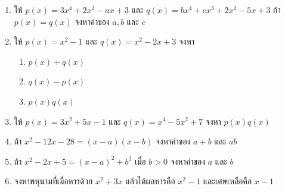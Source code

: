 \begin{enumerate}[label=\arabic*., leftmargin=*, itemsep=0.6em]
	\item ให้ $p(x) = 3x^4 + 2x^2 - ax + 3$ และ $q(x) = bx^4 + cx^3 + 2x^2 - 5x + 3$ ถ้า $p(x) = q(x)$ จงหาค่าของ $a, b$ และ $c$
	
	\item ให้ $p(x) = x^2 - 1$ และ $q(x) = x^2 - 2x + 3$ จงหา
	\begin{enumerate}[label=\theenumi\arabic*), leftmargin=2em, itemsep=0.5em]
		\everymath{\displaystyle}
		\item $p(x) + q(x)$
		\item $q(x) - p(x)$
		\item $p(x)q(x)$
	\end{enumerate}
	
	\item ให้ $p(x) = 3x^2 + 5x - 1$ และ $q(x) = x^4 - 5x^2 + 7$ จงหา $p(x)q(x)$
	
	\item ถ้า $x^2 - 12x - 28 = (x-a)(x-b)$ จงหาค่าของ $a+b$ และ $ab$
	
	\item ถ้า $x^2 - 2x + 5 = (x-a)^2 + b^2$ เมื่อ $b > 0$ จงหาค่าของ $a$ และ $b$
	
	\item จงหาพหุนามที่เมื่อหารด้วย $x^2 + 3x$ แล้วได้ผลหารคือ $x^2 - 1$ และเศษเหลือคือ $x - 1$
	

\end{enumerate}
